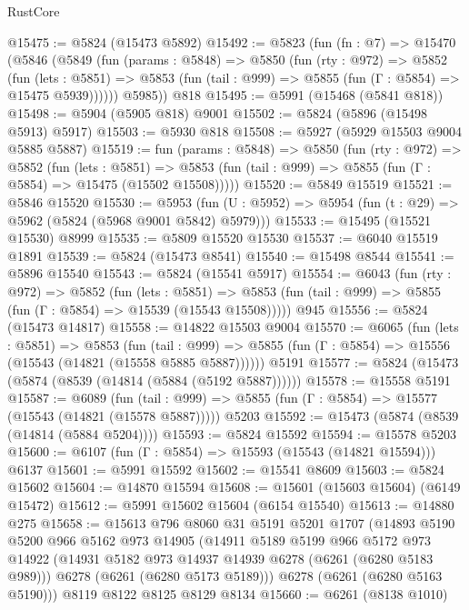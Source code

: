 \begin{lexlean}{RustCore}
\begin{coremodule}
@15475 := @5824 (@15473 @5892)
@15492 := @5823
    (fun (fn : @7) =>
    @15470
      (@5846
        (@5849
          (fun (params : @5848) =>
          @5850
            (fun (rty : @972) =>
            @5852
              (fun (lets : @5851) =>
              @5853 (fun (tail : @999) => @5855 (fun (Γ : @5854) => @15475 @5939))))))
        @5985))
    @818
@15495 := @5991 (@15468 (@5841 @818))
@15498 := @5904 (@5905 @818) @9001
@15502 := @5824 (@5896 (@15498 @5913) @5917)
@15503 := @5930 @818
@15508 := @5927 (@5929 @15503 @9004 @5885 @5887)
@15519 := fun (params : @5848) =>
  @5850
    (fun (rty : @972) =>
    @5852
      (fun (lets : @5851) =>
      @5853 (fun (tail : @999) => @5855 (fun (Γ : @5854) => @15475 (@15502 @15508)))))
@15520 := @5849 @15519
@15521 := @5846 @15520
@15530 := @5953
    (fun (U : @5952) => @5954 (fun (t : @29) => @5962 (@5824 (@5968 @9001 @5842) @5979)))
@15533 := @15495 (@15521 @15530) @8999
@15535 := @5809 @15520 @15530
@15537 := @6040 @15519 @1891
@15539 := @5824 (@15473 @8541)
@15540 := @15498 @8544
@15541 := @5896 @15540
@15543 := @5824 (@15541 @5917)
@15554 := @6043
    (fun (rty : @972) =>
    @5852
      (fun (lets : @5851) =>
      @5853 (fun (tail : @999) => @5855 (fun (Γ : @5854) => @15539 (@15543 @15508)))))
    @945
@15556 := @5824 (@15473 @14817)
@15558 := @14822 @15503 @9004
@15570 := @6065
    (fun (lets : @5851) =>
    @5853
      (fun (tail : @999) =>
      @5855 (fun (Γ : @5854) => @15556 (@15543 (@14821 (@15558 @5885 @5887))))))
    @5191
@15577 := @5824 (@15473 (@5874 (@8539 (@14814 (@5884 (@5192 @5887))))))
@15578 := @15558 @5191
@15587 := @6089
    (fun (tail : @999) => @5855 (fun (Γ : @5854) => @15577 (@15543 (@14821 (@15578 @5887)))))
    @5203
@15592 := @15473 (@5874 (@8539 (@14814 (@5884 @5204))))
@15593 := @5824 @15592
@15594 := @15578 @5203
@15600 := @6107 (fun (Γ : @5854) => @15593 (@15543 (@14821 @15594))) @6137
@15601 := @5991 @15592
@15602 := @15541 @8609
@15603 := @5824 @15602
@15604 := @14870 @15594
@15608 := @15601 (@15603 @15604) (@6149 @15472)
@15612 := @5991 @15602 @15604 (@6154 @15540)
@15613 := @14880 @275
@15658 := @15613
    @796
    @8060
    @31
    @5191
    @5201
    @1707
    (@14893
      @5190
      @5200
      @966
      @5162
      @973
      @14905
      (@14911
        @5189
        @5199
        @966
        @5172
        @973
        @14922
        (@14931 @5182 @973 @14937 @14939 @6278 (@6261 (@6280 @5183 @989)))
        @6278
        (@6261 (@6280 @5173 @5189)))
      @6278
      (@6261 (@6280 @5163 @5190)))
    @8119
    @8122
    @8125
    @8129
    @8134
@15660 := @6261 (@8138 @1010)

\end{coremodule}
\end{lexlean}
